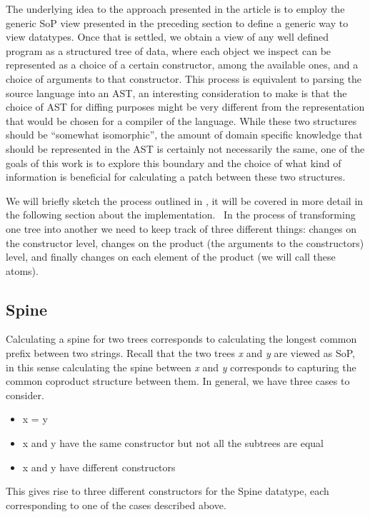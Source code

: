 \documentclass[11pt]{article}
\begin{document}
The underlying idea to the approach presented in the article is to employ
the generic SoP view presented in the preceding section to define a
generic way to view datatypes. Once that is settled, we obtain a view of
any well defined program as a structured tree of data, where each object
we inspect can be represented as a choice of a certain constructor,
among the available ones, and a choice of arguments to that constructor.
This process is equivalent to parsing the source language into an AST,
an interesting consideration to make is that the choice of AST for
diffing purposes might be very different from the representation that
would be chosen for a compiler of the language. While these two
structures should be ``somewhat isomorphic'', the amount of domain
specific knowledge that should be represented in the AST is certainly
not necessarily the same, one of the goals of this work is to explore
this boundary and the choice of what kind of information is beneficial
for calculating a patch between these two structures.

We will briefly sketch the process outlined in \cite{type-directed-diff}, it 
will be covered in more detail in the following section about the 
implementation.
\ 
In the process of transforming one tree into another we need to keep track of three different things: 
changes on the constructor level, changes on the product (the arguments to the constructors) 
level, and finally changes on each element of the product (we will call these 
atoms).
\subsection{Spine}\label{spine}

Calculating a spine for two trees corresponds to calculating the
longest common prefix between two strings. Recall that the two trees
\emph{x} and \emph{y} are viewed as SoP, in this sense calculating the
spine between \emph{x} and \emph{y} corresponds to capturing the common
coproduct structure between them. In general, we have three cases to
consider. 
\begin{itemize}
  \item x = y 
  \item x and y have the same constructor but not all the
subtrees are equal  
  \item x and y have different constructors
\end{itemize}
 This gives rise
to three different constructors for the Spine datatype, each
corresponding to one of the cases described above.
\end{document}
